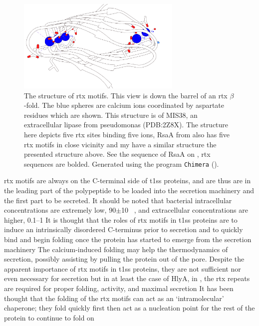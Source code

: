   \begin{figure}[htb]
    \begin{center}
      \includegraphics[width=0.7\textwidth]{intro/img/rtx-white.png}
    \end{center}
    \caption[The structure of \ac{rtx} motifs]{The structure of \ac{rtx} motifs. This view is down the barrel of an \ac{rtx} $\beta$-fold. The blue spheres are calcium ions coordinated by aspartate residues which are shown. This structure is of MIS38, an extracellular lipase from \ac{pseudomonas} (PDB:2Z8X). The structure here depicts five \ac{rtx} sites binding five  ions, RsaA from \caulobacter also has five \ac{rtx} motifs in close vicinity and my have a similar structure the presented structure above. See the sequence of RsaA on , \ac{rtx} sequences are bolded. Generated using the program \texttt{Chimera} ().
    }
    \label{fig:intro-rtx}
  \end{figure}   

  \ac{rtx} motifs are always on the C-terminal side of \ac{t1ss} proteins, and are thus are in the leading part of the polypeptide to be loaded into the secretion machinery and the first part to be secreted. It should be noted that bacterial intracellular  concentrations are extremely low, 90$\pm$10 \si{\nano\molar}, and extracellular  concentrations are higher, 0.1--1 \millimolar{} It is thought that the roles of \ac{rtx} motifs in \ac{t1ss} proteins are to induce an intrinsically disordered C-terminus prior to secretion and to quickly  bind  and begin folding once the protein has started to emerge from the secretion machinery The calcium-induced folding may help the thermodynamics of secretion, possibly assisting by pulling the protein out of the pore.  Despite the apparent importance of \ac{rtx} motifs in \ac{t1ss} proteins, they are not sufficient nor even necessary for secretion but in at least the case of HlyA, in \ecoli, the \ac{rtx} repeats are required for proper folding, activity, and maximal secretion It has been thought that the folding of the \ac{rtx} motifs can act as an `intramolecular' chaperone; they fold quickly first then act as a nucleation point for the rest of the protein to continue to fold on 
 
